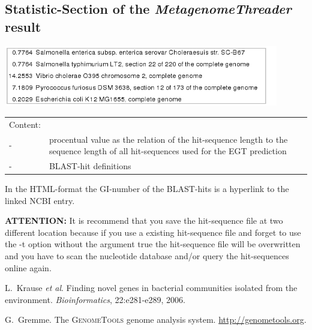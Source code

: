 \documentclass[12pt,titlepage]{article}
\newcommand{\MetagenomeThreader}{\textit{MetagenomeThreader}\xspace}
\newcommand{\Attention}{\textbf{ATTENTION:}\xspace}
\begin{document}
\subsection{Statistic-Section of the \MetagenomeThreader result}

\includegraphics[height=2.64cm, width=12.01cm]{mgthgraphics/statistic_mg.jpg}

\begin{tabular}{p{}p{14cm}}
Content:
\\
- &procentual value as the relation of the hit-sequence length
to the sequence length of all hit-sequences used for the EGT prediction
\\
- &BLAST-hit definitions
\end{tabular}

In the HTML-format the GI-number of the BLAST-hits is a hyperlink to the
linked NCBI entry.

\Attention It is recommend that you save the hit-sequence file at two
different location because if you use a existing hit-sequence file and
forget to use the -t option without the argument true the hit-sequence file
will be overwritten and you have to scan the nucleotide database and/or query
the hit-sequences online again.

%
%
\begin{thebibliography}{1}

L.~Krause \textit{et al}.
\newblock Finding novel genes in bacterial communities isolated
from the environment. \textit{Bioinformatics}, 22:e281-e289, 2006.

G.~Gremme.
\newblock The \textsc{GenomeTools} genome analysis system.
  \url{http://genometools.org}.

\end{thebibliography}
\end{document}
